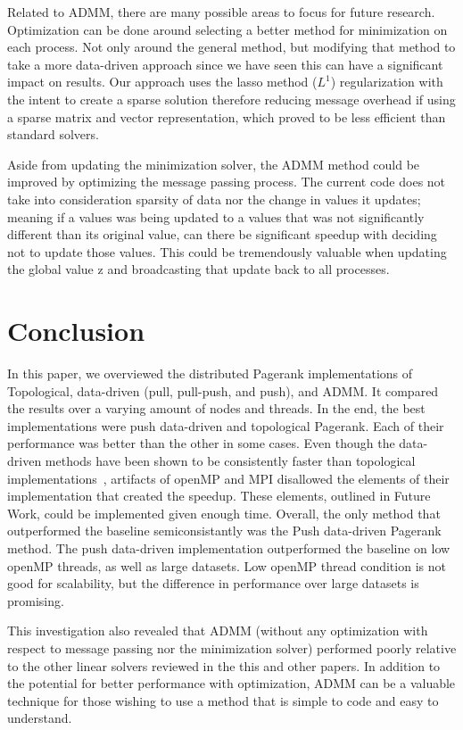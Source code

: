\documentclass[letterpaper,11pt,onecolumn]{article}
\begin{document}
Related to ADMM, there are many possible areas to focus for future research. Optimization can be done around selecting a better method for minimization on each process. Not only around the general method, but modifying that method to take a more data-driven approach since we have seen this can have a significant impact on results. Our approach uses the lasso method ($L^{1}$) regularization with the intent to create a sparse solution therefore reducing message overhead if using a sparse matrix and vector representation, which proved to be less efficient than standard solvers.

Aside from updating the minimization solver, the ADMM method could be improved by optimizing the message passing process. The current code does not take into consideration sparsity of data nor the change in values it updates; meaning if a values was being updated to a values that was not significantly different than its original value, can there be significant speedup with deciding not to update those values. This could be tremendously valuable when updating the global value z and broadcasting that update back to all processes.


\section{Conclusion}

In this paper, we overviewed the distributed Pagerank implementations of Topological, data-driven (pull, pull-push, and push), and ADMM. It compared the results over a varying amount of nodes and threads. In the end, the best implementations were push data-driven and topological Pagerank. Each of their performance was better than the other in some cases. Even though the data-driven methods have been shown to be consistently faster than topological implementations~\cite{Joyce}, artifacts of openMP and MPI disallowed the elements of their implementation that created the speedup. These elements, outlined in Future Work, could be implemented given enough time. Overall, the only method that outperformed the baseline semiconsistantly was the Push data-driven Pagerank method. The push data-driven implementation outperformed the baseline on low openMP threads, as well as large datasets. Low openMP thread condition is not good for scalability, but the difference in performance over large datasets is promising. 

This investigation also revealed that ADMM (without any optimization with respect to message passing nor the minimization solver) performed poorly relative to the other linear solvers reviewed in the this and other papers. In addition to the potential for better performance with optimization, ADMM can be a valuable technique for those wishing to use a method that is simple to code and easy to understand. 
\end{document}
